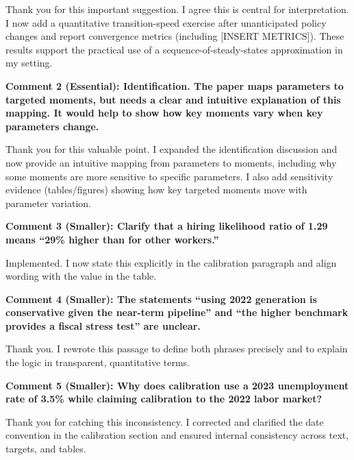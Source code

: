 \documentclass[12pt]{article}
\begin{document}
\begin{onehalfspacing}
\medskip

Thank you for this important suggestion. I agree this is central for interpretation. I now add a quantitative transition-speed exercise after unanticipated policy changes and report convergence metrics (including [INSERT METRICS]). These results support the practical use of a sequence-of-steady-states approximation in my setting.

\bigskip
\bigskip

\textbf{Comment 2 (Essential): Identification. The paper maps parameters to targeted moments, but needs a clear and intuitive explanation of this mapping. It would help to show how key moments vary when key parameters change.}

\medskip

Thank you for this valuable point. I expanded the identification discussion and now provide an intuitive mapping from parameters to moments, including why some moments are more sensitive to specific parameters. I also add sensitivity evidence (tables/figures) showing how key targeted moments move with parameter variation.

\bigskip
\bigskip

\textbf{Comment 3 (Smaller): Clarify that a hiring likelihood ratio of 1.29 means ``29\% higher than for other workers.''}

\medskip

Implemented. I now state this explicitly in the calibration paragraph and align wording with the value in the table.

\bigskip
\bigskip

\textbf{Comment 4 (Smaller): The statements ``using 2022 generation is conservative given the near-term pipeline'' and ``the higher benchmark provides a fiscal stress test'' are unclear.}

\medskip

Thank you. I rewrote this passage to define both phrases precisely and to explain the logic in transparent, quantitative terms.

\bigskip
\bigskip

\textbf{Comment 5 (Smaller): Why does calibration use a 2023 unemployment rate of 3.5\% while claiming calibration to the 2022 labor market?}

\medskip

Thank you for catching this inconsistency. I corrected and clarified the date convention in the calibration section and ensured internal consistency across text, targets, and tables.


\end{onehalfspacing}
\end{document}
